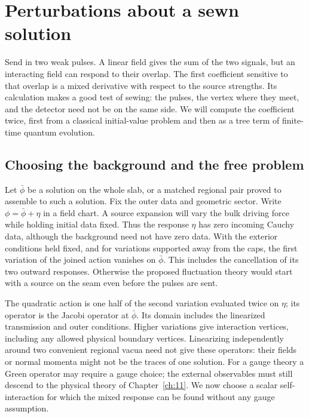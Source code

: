 \chapter{Perturbations about a sewn solution}\label{ch:12}
Send in two weak pulses. A linear field gives the sum of the two signals,
but an interacting field can respond to their overlap. The first coefficient
sensitive to that overlap is a mixed derivative with respect to the source
strengths. Its calculation makes a good test of sewing: the pulses, the
vertex where they meet, and the detector need not be on the same side. We
will compute the coefficient twice, first from a classical initial-value
problem and then as a tree term of finite-time quantum evolution.

\section{Choosing the background and the free problem}
Let $\bar\phi$ be a solution on the whole slab, or a matched regional pair
proved to assemble to such a solution. Fix the outer data and geometric
sector. Write $\phi=\bar\phi+\eta$ in a field chart. A source expansion
will vary the bulk driving force while holding initial data fixed. Thus the
response $\eta$ has zero incoming Cauchy data, although the background
need not have zero data. With the exterior conditions held fixed, and for
variations supported away from the caps, the first variation of the joined
action vanishes on $\bar\phi$. This includes the cancellation of its two
outward responses. Otherwise the proposed fluctuation theory would start
with a source on the seam even before the pulses are sent.

The quadratic action is one half of the second variation evaluated twice
on $\eta$; its operator is the Jacobi operator at $\bar\phi$. Its domain includes the linearized transmission and
outer conditions. Higher variations give interaction vertices, including
any allowed physical boundary vertices. Linearizing independently around
two convenient regional vacua need not give these operators: their fields
or normal momenta might not be the traces of one solution. For a gauge
theory a Green operator may require a gauge choice; the external
observables must still descend to the physical theory of
Chapter~\ref{ch:11}. We now choose a scalar self-interaction for which the
mixed response can be found without any gauge assumption.


